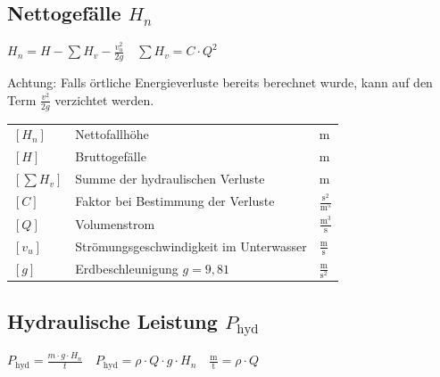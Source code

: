 \subsection{Nettogefälle \texorpdfstring{$H_n$}{Hn}}
$
\boxed{
H_n = H - \sum H_v - \frac{v_u^2}{2g}
}
\quad
\boxed{\sum H_v = C \cdot Q^2}
$

Achtung: Falls örtliche Energieverluste bereits berechnet wurde, kann auf den Term $\frac{v^2}{2g}$ verzichtet werden.

\vspace{0.15cm}

\renewcommand{\arraystretch}{1.2}
\begin{tabular}{@{} l p{6cm} l @{}}
    $[H_n]$       & Nettofallhöhe \dotfill & m \\
    $[H]$         & Bruttogefälle \dotfill & m \\
    $\left[\sum H_v\right]$ & Summe der hydraulischen Verluste \dotfill & m \\
    $[C]$         & Faktor bei Bestimmung der Verluste \dotfill & $\frac{\text{s}^{2}}{\text{m}^5}$ \\
    $[Q]$         & Volumenstrom \dotfill & $\frac{\text{m}^3}{\text{s}}$ \\
    $[v_u]$         & Strömungsgeschwindigkeit im Unterwasser \dotfill & $\frac{\text{m}}{\text{s}}$ \\
    $[g]$         & Erdbeschleunigung $g = 9{,}81$ \dotfill & $\frac{\text{m}}{\text{s}^2}$ \\
\end{tabular}



\subsection{\texorpdfstring{Hydraulische Leistung $P_{\text{hyd}}$}{Hydraulische Leistung Phyd}}

$
\boxed{P_{\text{hyd}} = \frac{m \cdot g \cdot H_n}{t} }
\quad
\boxed{P_{\text{hyd}} = \rho \cdot Q \cdot g \cdot H_n}
\quad
\boxed{\frac{\text{m}}{\text{t}} = \rho \cdot Q}
$

\vspace{0.15cm}

